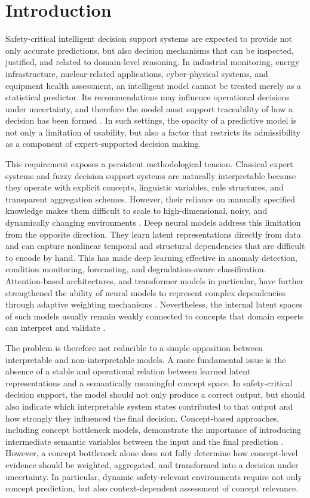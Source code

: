 \documentclass[runningheads]{llncs}
\begin{document}
\section{Introduction}

Safety-critical intelligent decision support systems are expected to provide not only accurate predictions, but also decision mechanisms that can be inspected, justified, and related to domain-level reasoning. In industrial monitoring, energy infrastructure, nuclear-related applications, cyber-physical systems, and equipment health assessment, an intelligent model cannot be treated merely as a statistical predictor. Its recommendations may influence operational decisions under uncertainty, and therefore the model must support traceability of how a decision has been formed \cite{schwalbe2024criticalxai}. In such settings, the opacity of a predictive model is not only a limitation of usability, but also a factor that restricts its admissibility as a component of expert-supported decision making.

This requirement exposes a persistent methodological tension. Classical expert systems and fuzzy decision support systems are naturally interpretable because they operate with explicit concepts, linguistic variables, rule structures, and transparent aggregation schemes. However, their reliance on manually specified knowledge makes them difficult to scale to high-dimensional, noisy, and dynamically changing environments \cite{onwujekwe2025idss}. Deep neural models address this limitation from the opposite direction. They learn latent representations directly from data and can capture nonlinear temporal and structural dependencies that are difficult to encode by hand. This has made deep learning effective in anomaly detection, condition monitoring, forecasting, and degradation-aware classification. Attention-based architectures, and transformer models in particular, have further strengthened the ability of neural models to represent complex dependencies through adaptive weighting mechanisms \cite{vaswani2017attention}. Nevertheless, the internal latent spaces of such models usually remain weakly connected to concepts that domain experts can interpret and validate \cite{schwalbe2024criticalxai}.

The problem is therefore not reducible to a simple opposition between interpretable and non-interpretable models. A more fundamental issue is the absence of a stable and operational relation between learned latent representations and a semantically meaningful concept space. In safety-critical decision support, the model should not only produce a correct output, but should also indicate which interpretable system states contributed to that output and how strongly they influenced the final decision. Concept-based approaches, including concept bottleneck models, demonstrate the importance of introducing intermediate semantic variables between the input and the final prediction \cite{koh2020cbm}. However, a concept bottleneck alone does not fully determine how concept-level evidence should be weighted, aggregated, and transformed into a decision under uncertainty. In particular, dynamic safety-relevant environments require not only concept prediction, but also context-dependent assessment of concept relevance.
\end{document}
